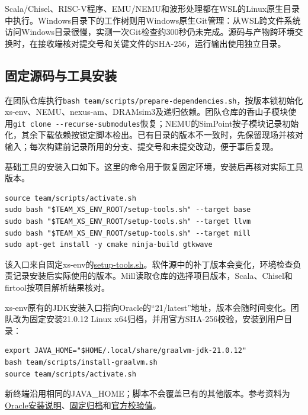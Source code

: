 Scala/Chisel、RISC-V程序、EMU/NEMU和波形处理都在WSL的Linux原生目录中执行。Windows目录下的工作树则用Windows原生Git管理：从WSL跨文件系统访问Windows目录很慢，实测一次Git检查约300秒仍未完成。源码与产物跨环境交换时，在接收端核对提交号和关键文件的SHA-256，运行输出使用独立目录。

\subsection{固定源码与工具安装}

在团队仓库执行\Verb|bash team/scripts/prepare-dependencies.sh|，按版本锁初始化xs-env、NEMU、nexus-am、DRAMsim3及递归依赖。团队仓库的香山子模块使用\Verb|git clone --recurse-submodules|恢复；NEMU的SimPoint按子模块记录初始化，其余下载依赖按锁定脚本检出。已有目录的版本不一致时，先保留现场并核对输入；每次构建前记录所用的分支、提交号和未提交改动，便于事后复现。

基础工具的安装入口如下。这里的命令用于恢复固定环境，安装后再核对实际工具版本。
\begin{Verbatim}[breaklines,breakanywhere,breaksymbolleft={},breaksymbolright={},fontsize=\footnotesize,baselinestretch=1]
source team/scripts/activate.sh
sudo bash "$TEAM_XS_ENV_ROOT/setup-tools.sh" --target base
sudo bash "$TEAM_XS_ENV_ROOT/setup-tools.sh" --target llvm
sudo bash "$TEAM_XS_ENV_ROOT/setup-tools.sh" --target mill
sudo apt-get install -y cmake ninja-build gtkwave
\end{Verbatim}

该入口来自固定xs-env的\href{https://github.com/OpenXiangShan/xs-env/blob/b0b506481e839a5df8a580e76f5aa246dc60fe7c/setup-tools.sh}{setup-tools.sh}。软件源中的补丁版本会变化，环境检查负责记录安装后实际使用的版本。Mill读取仓库的选择项目版本，Scala、Chisel和firtool按项目解析结果核对。

xs-env原有的JDK安装入口指向Oracle的“21/latest”地址，版本会随时间变化。团队改为固定安装21.0.12 Linux x64归档，并用官方SHA-256校验，安装到用户目录：
\begin{Verbatim}[breaklines,breakanywhere,breaksymbolleft={},breaksymbolright={},fontsize=\footnotesize,baselinestretch=1]
export JAVA_HOME="$HOME/.local/share/graalvm-jdk-21.0.12"
bash team/scripts/install-graalvm.sh
source team/scripts/activate.sh
\end{Verbatim}

新终端沿用相同的JAVA\_HOME；脚本不会覆盖已有的其他版本。参考资料为\href{https://docs.oracle.com/en/graalvm/jdk/21/docs/getting-started/installation-linux/}{Oracle安装说明}、\href{https://download.oracle.com/graalvm/21/archive/graalvm-jdk-21.0.12\_linux-x64\_bin.tar.gz}{固定归档}和\href{https://download.oracle.com/graalvm/21/archive/graalvm-jdk-21.0.12\_linux-x64\_bin.tar.gz.sha256}{官方校验值}。

